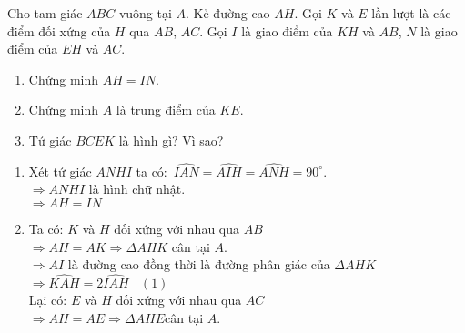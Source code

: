 \begin{ex}%
Cho tam giác $ABC$ vuông tại $A$. Kẻ đường cao $AH$. Gọi $K$ và $E$ lần lượt là các điểm đối xứng của $H$ qua $AB$, $AC$. Gọi $I$ là giao điểm của $KH$ và $AB$, $N$ là giao điểm của $EH$ và $AC$.
\begin{enumerate}
\item Chứng minh $AH=IN$.
\item Chứng minh $A$ là trung điểm của $KE$.
\item Tứ giác $BCEK$ là hình gì? Vì sao?
\end{enumerate}

	\loigiai
	{
\begin{center}
\end{center}
\begin{enumerate}
\item  Xét tứ giác $ANHI$ ta có:\
$\widehat{IAN}=\widehat{AIH}=\widehat{ANH}=90^\circ$.\\
$\Rightarrow ANHI$ là hình chữ nhật.\\
$\Rightarrow AH=IN$
\item Ta có: $K$ và $H$ đối xứng với nhau qua $AB$\\
$\Rightarrow AH=AK$$\Rightarrow \Delta AHK$ cân tại $A$.\\
$\Rightarrow AI$ là đường cao đồng thời là đường phân giác của $\Delta AHK$\\
$\Rightarrow \widehat{KAH}=2\widehat{IAH}~~~~(1)$\\
Lại có: $E$ và $H$ đối xứng với nhau qua $AC$\\
$\Rightarrow AH=AE$$\Rightarrow \Delta AHE$cân tại $A$.\\

\end{enumerate}}
\end{ex}
